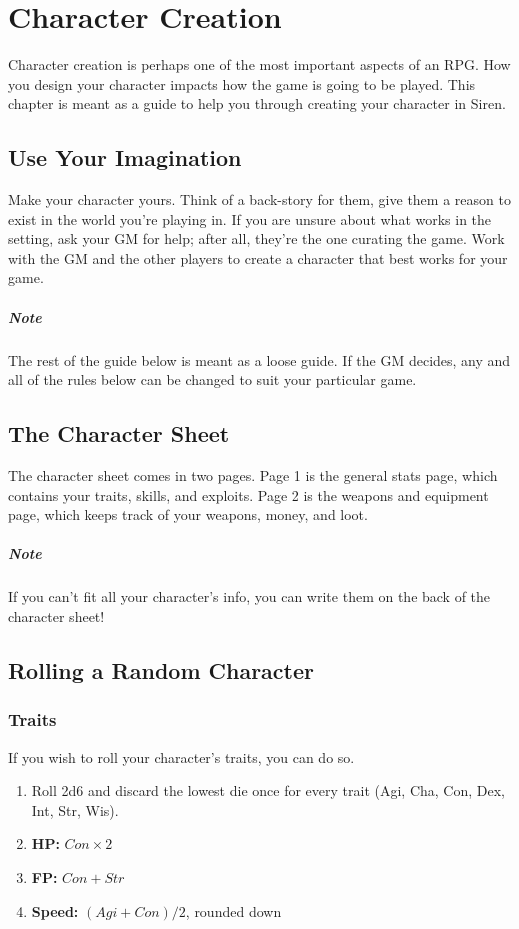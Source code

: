 \chapter{Character Creation}
Character creation is perhaps one of the most important aspects of an RPG.
How you design your character impacts how the game is going to be played.
This chapter is meant as a guide to help you through creating your character in Siren.

\section{Use Your Imagination}
Make your character yours.
Think of a back-story for them, give them a reason to exist in the world you're playing in.
If you are unsure about what works in the setting, ask your GM for help; after all, they're the one curating the game.
Work with the GM and the other players to create a character that best works for your game.

\paragraph{Note} The rest of the guide below is meant as a loose guide.
If the GM decides, any and all of the rules below can be changed to suit your particular game.

\section{The Character Sheet}
The character sheet comes in two pages.
Page 1 is the general stats page, which contains your traits, skills, and exploits.
Page 2 is the weapons and equipment page, which keeps track of your weapons, money, and loot.

\paragraph{Note} If you can't fit all your character's info, you can write them on the back of the character sheet!

\section{Rolling a Random Character}
\subsection{Traits}
If you wish to roll your character's traits, you can do so.
\begin{enumerate}
\item Roll 2d6 and discard the lowest die once for every trait (Agi, Cha, Con, Dex, Int, Str, Wis).
\item \textbf{HP:} $Con \times 2$
\item \textbf{FP:} $Con + Str$
\item \textbf{Speed:} $(Agi + Con) / 2$, rounded down
\end{enumerate}

